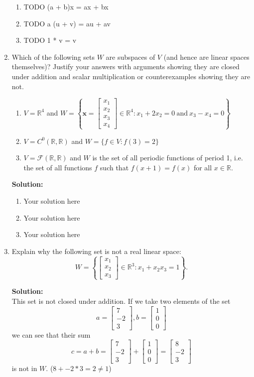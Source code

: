 \documentclass[]{article}
\newcommand{\R}{\mathbb{R}}
\newcommand{\bbm}{\begin{bmatrix}}
\newcommand{\ebm}{\end{bmatrix}}
\newcommand{\x}{\bm{x}}
\newcommand{\solution}{\vskip 0.5cm \textbf{\large Solution:} \\}
\begin{document}
\begin{enumerate}[resume]
\begin{enumerate}
      \item TODO (a + b)x = ax + bx
      \item TODO a (u + v) = au + av
      \item TODO 1 * v = v
      \end{enumerate}
         
	\item Which of the following sets $W$ are subspaces of $V$ (and hence are linear spaces themselves)? Justify your answers with arguments showing they are closed under addition and scalar multiplication or counterexamples showing they are not.
	\begin{enumerate}
		\item $V = \R^4$ and $W = \left\{ \x=\bbm x_1\\x_2\\x_3\\x_4 \ebm\in\R^4: x_1+2x_2 = 0 ~\mathrm{and}~ x_3-x_4=0 \right\}$
		\item $V=C^0(\R,\R)$ and $W = \{ f\in V : f(3) = 2\}$
		\item $V = \mathcal{F}(\R,\R)$ and $W$ is the set of all periodic functions of period 1, i.e. the set of all functions $f$ such that $f(x+1)=f(x)$ for all $x\in\R$.
	\end{enumerate}

	\solution

	\begin{enumerate}
		\item Your solution here
		\item Your solution here
		\item Your solution here
	\end{enumerate}

	\item Explain why the following set is not a real linear space:
	\[
	W=\left\{\bbm x_1\\x_2\\x_3 \ebm\in\R^3 : x_1+x_2x_3=1\right\}.
	\]
	
	\solution
    This set is not closed under addition. If we take two elements of the set
    \[
    a = \bbm 7 \\ -2 \\ 3 \ebm, b = \bbm 1  \\ 0 \\ 0 \ebm
    \]
    we can see that their sum
    \[
    c = a + b = \bbm 7 \\ -2 \\ 3 \ebm + \bbm 1  \\ 0 \\ 0 \ebm = \bbm 8 \\ -2 \\ 3 \ebm
    \]
    is not in $W$. ($8 + -2*3 = 2 \neq 1$)
\end{enumerate}
\end{document}
